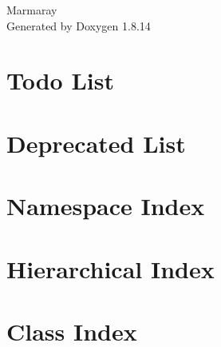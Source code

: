\documentclass[twoside]{book}
\newcommand{\+}{\discretionary{\mbox{\scriptsize$\hookleftarrow$}}{}{}}
\newcommand{\clearemptydoublepage}{%
  \newpage{\pagestyle{empty}\cleardoublepage}%
}
\begin{document}
\hypersetup{pageanchor=false,
             bookmarksnumbered=true,
             pdfencoding=unicode
            }
\begin{titlepage}
\vspace*{7cm}
\begin{center}%
{\Large Marmaray }\\
\vspace*{1cm}
{\large Generated by Doxygen 1.8.14}\\
\end{center}
\end{titlepage}
\clearemptydoublepage
{}
\tableofcontents
\clearemptydoublepage
{}
\hypersetup{pageanchor=true}

\chapter{Todo List}
\label{todo}

\chapter{Deprecated List}
\label{deprecated}

\chapter{Namespace Index}

\chapter{Hierarchical Index}

\chapter{Class Index}

\end{document}

